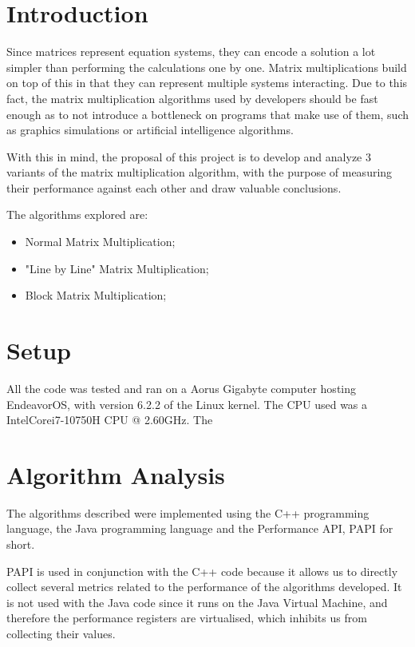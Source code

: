 \documentclass[11pt,a4paper]{article}
\begin{document}
\section{Introduction}

Since matrices represent equation systems, they can encode a solution a lot simpler than performing the calculations one by one. Matrix multiplications build on top of this in that they can represent multiple systems interacting. Due to this fact, the matrix multiplication algorithms used by developers should be fast enough as to not introduce a bottleneck on programs that make use of them, such as graphics simulations or artificial intelligence algorithms.

With this in mind, the proposal of this project is to develop and analyze 3 variants of the matrix multiplication algorithm, with the purpose of measuring their performance against each other and draw valuable conclusions.

The algorithms explored are:
\begin{itemize}
    \item Normal Matrix Multiplication;
    \item "Line by Line" Matrix Multiplication;
    \item Block Matrix Multiplication;
\end{itemize}

\section{Setup}

All the code was tested and ran on a Aorus Gigabyte computer hosting EndeavorOS, with version 6.2.2 of the Linux kernel. The CPU used was a Intel\textregistered Core\texttrademark i7-10750H CPU @ 2.60GHz. The 

\section{Algorithm Analysis}

The algorithms described were implemented using the C++ programming language, the Java programming language and the Performance API, PAPI for short.

PAPI is used in conjunction with the C++ code because it allows us to directly collect several metrics related to the performance of the algorithms developed.
It is not used with the Java code since it runs on the Java Virtual Machine, and therefore the performance registers are virtualised, which inhibits us from collecting their values.
\end{document}

